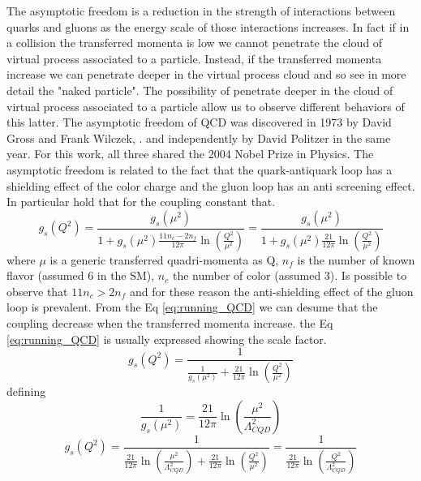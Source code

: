 \documentclass[12pt,a4paper]{book}
\begin{document}
	The asymptotic freedom is a reduction in the strength of interactions between quarks and gluons as the energy scale of those interactions increases. In fact if in a collision the transferred momenta is low we cannot penetrate the cloud of virtual process associated to a particle. Instead, if the transferred momenta increase we can penetrate deeper in the virtual process cloud and so see in more detail the "naked particle". The possibility of penetrate deeper in the cloud of virtual process associated to a particle allow us to observe different behaviors of this latter. The asymptotic freedom of QCD was discovered in 1973 by David Gross and Frank Wilczek, \cite{DAVIDPOLITZER1974129}. and independently by David Politzer in the same year. For this work, all three shared the 2004 Nobel Prize in Physics. The asymptotic freedom is related to the fact that the quark-antiquark loop has a shielding effect of the color charge and the gluon loop has an anti screening effect. In particular hold that for the coupling constant that.
	\begin{equation}
		g_s(Q^2)= \frac{g_s(\mu^2)}{1+g_s(\mu^2) \frac{11 n_c- 2n_f}{12\pi} \ln\left(\frac{Q^2}{\mu^2}\right)} = \frac{g_s(\mu^2)}{1+g_s(\mu^2) \frac{21}{12\pi} \ln\left(\frac{Q^2}{\mu^2}\right)}
		\label{eq:running_QCD}
	\end{equation}
	where $\mu$ is a generic transferred quadri-momenta as Q, $n_f$ is the number of known flavor (assumed 6 in the SM), $n_c$ the number of color (assumed 3). Is possible to observe that $11n_c>2n_f$ and for these reason the anti-shielding effect of the gluon loop is prevalent. From the Eq \ref{eq:running_QCD} we can desume that the coupling decrease when the transferred momenta increase. the Eq \ref{eq:running_QCD} is usually expressed showing the scale factor. 
	\begin{equation}
		g_s(Q^2)= \frac{1}{\frac{1}{g_s(\mu^2)}+ \frac{21}{12\pi} \ln\left(\frac{Q^2}{\mu^2}\right)}
		\label{eq:running_QCD2}
	\end{equation} 
	defining 
	\begin{equation}
		\frac{1}{g_s(\mu^2)}= \frac{21}{12\pi} \ln\left(\frac{\mu^2}{\Lambda_{CQD}^2}\right)
	\end{equation} 
	\begin{equation}
		g_s(Q^2)=  \frac{1}{\frac{21}{12\pi} \ln\left(\frac{\mu^2}{\Lambda_{CQD}^2}\right)+ \frac{21}{12\pi} \ln\left(\frac{Q^2}{\mu^2}\right) }
		=\frac{1}{\frac{21}{12\pi} \ln \left(\frac{Q^2}{\Lambda_{CQD}^2}\right)}
		\label{eq:running_QCD_scale_factor}
	\end{equation} 
\end{document}
